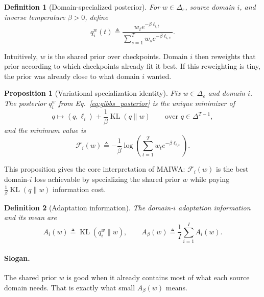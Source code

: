 \documentclass{article}
\newtheorem{proposition}{Proposition}
\newtheorem{definition}{Definition}
\newcommand{\KL}{\operatorname{KL}}
\newcommand{\simplex}{\Delta}
\newcommand{\maiwa}{\textup{\textsc{MAIWA}}}
\newcommand{\inner}[2]{\left\langle #1, #2 \right\rangle}
\newcommand{\epssimplex}{\simplex_{\varepsilon}}
\newcommand{\free}{\mathcal{F}}
\begin{document}
\begin{definition}[Domain-specialized posterior]
\label{def:posterior}
For \(w \in \epssimplex\), source domain \(i\), and inverse temperature \(\beta>0\), define
\begin{equation}
    q_i^w(t)
    \triangleq
    \frac{w_t e^{-\beta \ell_{i,t}}}
         {\sum_{s=1}^{T} w_s e^{-\beta \ell_{i,s}}}.
    \label{eq:gibbs_posterior}
\end{equation}
\end{definition}

Intuitively, \(w\) is the shared prior over checkpoints. Domain \(i\) then reweights that prior according to which checkpoints already fit it best. If this reweighting is tiny, the prior was already close to what domain \(i\) wanted.

\begin{proposition}[Variational specialization identity]
\label{prop:variational}
Fix \(w \in \epssimplex\) and domain \(i\). The posterior \(q_i^w\) from Eq.~\eqref{eq:gibbs_posterior} is the unique minimizer of
\begin{equation}
    q \mapsto \inner{q}{\ell_i} + \frac{1}{\beta}\KL(q\|w)
    \qquad \text{over } q \in \simplex^{T-1},
    \label{eq:variational_specialization}
\end{equation}
and the minimum value is
\begin{equation}
    \free_i(w)
    \triangleq
    -\frac{1}{\beta}\log\!\left(\sum_{t=1}^{T} w_t e^{-\beta \ell_{i,t}}\right).
    \label{eq:free_energy}
\end{equation}
\end{proposition}

This proposition gives the core interpretation of \maiwa{}: \(\free_i(w)\) is the best domain-\(i\) loss achievable by specializing the shared prior \(w\) while paying \(\frac{1}{\beta}\KL(q\|w)\) information cost.

\begin{definition}[Adaptation information]
\label{def:adapt_kl}
The domain-\(i\) adaptation information and its mean are
\begin{equation}
    A_i(w) \triangleq \KL(q_i^w\|w),
    \qquad
    A_\beta(w) \triangleq \frac{1}{I}\sum_{i=1}^{I} A_i(w).
\end{equation}
\end{definition}

\paragraph{Slogan.}
The shared prior \(w\) is good when it already contains most of what each source domain needs. That is exactly what small \(A_\beta(w)\) means.
\end{document}
